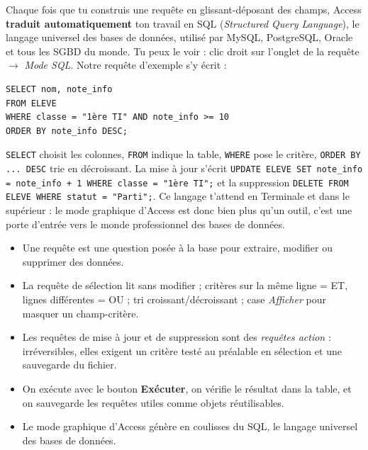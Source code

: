 \documentclass[11pt]{article}
\newcommand{\cle}[1]{{\popxbold\color{popdark}#1}}
\begin{document}
\begin{savaistu}
Chaque fois que tu construis une requête en glissant-déposant des champs, Access \textbf{traduit automatiquement} ton travail en \cle{SQL} (\emph{Structured Query Language}), le langage universel des bases de données, utilisé par MySQL, PostgreSQL, Oracle et tous les SGBD du monde. Tu peux le voir : clic droit sur l'onglet de la requête $\to$ \emph{Mode SQL}. Notre requête d'exemple s'y écrit :
\begin{lstlisting}
SELECT nom, note_info
FROM ELEVE
WHERE classe = "1ère TI" AND note_info >= 10
ORDER BY note_info DESC;
\end{lstlisting}
\texttt{SELECT} choisit les colonnes, \texttt{FROM} indique la table, \texttt{WHERE} pose le critère, \texttt{ORDER BY ... DESC} trie en décroissant. La mise à jour s'écrit \texttt{UPDATE ELEVE SET note\_info = note\_info + 1 WHERE classe = "1ère TI";} et la suppression \texttt{DELETE FROM ELEVE WHERE statut = "Parti";}. Ce langage t'attend en Terminale et dans le supérieur : le mode graphique d'Access est donc bien plus qu'un outil, c'est une porte d'entrée vers le monde professionnel des bases de données.
\end{savaistu}

\begin{aretenir}
\begin{itemize}
\item Une \cle{requête} est une question posée à la base pour extraire, modifier ou supprimer des données.
\item La \cle{requête de sélection} lit sans modifier ; critères sur la même ligne = ET, lignes différentes = OU ; tri croissant/décroissant ; case \emph{Afficher} pour masquer un champ-critère.
\item Les requêtes de \cle{mise à jour} et de \cle{suppression} sont des \emph{requêtes action} : irréversibles, elles exigent un critère testé au préalable en sélection et une sauvegarde du fichier.
\item On exécute avec le bouton \textbf{Exécuter}, on vérifie le résultat dans la table, et on sauvegarde les requêtes utiles comme objets réutilisables.
\item Le mode graphique d'Access génère en coulisses du \cle{SQL}, le langage universel des bases de données.
\end{itemize}
\end{aretenir}
\end{document}
